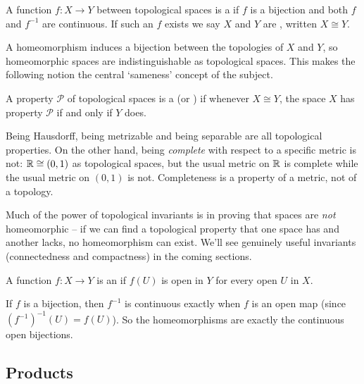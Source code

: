 \documentclass[a4paper]{scrartcl}
\begin{document}
\begin{definition}[Homeomorphism]
    A function $f: X \rightarrow Y$ between topological spaces is a  if $f$ is a bijection and both $f$ and $f^{-1}$ are continuous. If such an $f$ exists we say $X$ and $Y$ are , written $X \cong Y$.
\end{definition}

A homeomorphism induces a bijection between the topologies of $X$ and $Y$, so homeomorphic spaces are indistinguishable as topological spaces. This makes the following notion the central `sameness' concept of the subject.

\begin{definition}
    A property $\mathcal{P}$ of topological spaces is a  (or ) if whenever $X \cong Y$, the space $X$ has property $\mathcal{P}$ if and only if $Y$ does.
\end{definition}

\begin{example}
    Being Hausdorff, being metrizable and being separable are all topological properties. On the other hand, being \emph{complete} with respect to a specific metric is not: $\mathbb{R} \cong (0, 1)$ as topological spaces, but the usual metric on $\mathbb{R}$ is complete while the usual metric on $(0, 1)$ is not. Completeness is a property of a metric, not of a topology.
\end{example}

Much of the power of topological invariants is in proving that spaces are \emph{not} homeomorphic -- if we can find a topological property that one space has and another lacks, no homeomorphism can exist. We'll see genuinely useful invariants (connectedness and compactness) in the coming sections.

\begin{definition}
    A function $f: X \rightarrow Y$ is an  if $f(U)$ is open in $Y$ for every open $U$ in $X$.
\end{definition}

If $f$ is a bijection, then $f^{-1}$ is continuous exactly when $f$ is an open map (since $(f^{-1})^{-1}(U) = f(U)$). So the homeomorphisms are exactly the continuous open bijections.

\subsection{Products}
\end{document}

